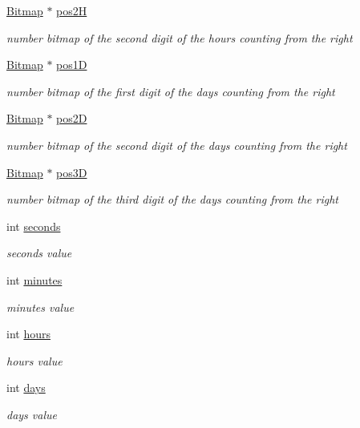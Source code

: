 \begin{DoxyCompactItemize}
\hyperlink{struct_bitmap}{Bitmap} $\ast$ \hyperlink{struct_countdown_a2bd11b0753bf2e5db41448090cd63383}{pos2H}
\begin{DoxyCompactList}\small\item\em number bitmap of the second digit of the hours counting from the right \end{DoxyCompactList}\item 
\hyperlink{struct_bitmap}{Bitmap} $\ast$ \hyperlink{struct_countdown_a39589db8fec236a931a448154c7975c5}{pos1D}
\begin{DoxyCompactList}\small\item\em number bitmap of the first digit of the days counting from the right \end{DoxyCompactList}\item 
\hyperlink{struct_bitmap}{Bitmap} $\ast$ \hyperlink{struct_countdown_a3ece20d4a7a7bc9b6fa79ef0cdf378b3}{pos2D}
\begin{DoxyCompactList}\small\item\em number bitmap of the second digit of the days counting from the right \end{DoxyCompactList}\item 
\hyperlink{struct_bitmap}{Bitmap} $\ast$ \hyperlink{struct_countdown_aca363fff11b394450053a007b084e551}{pos3D}
\begin{DoxyCompactList}\small\item\em number bitmap of the third digit of the days counting from the right \end{DoxyCompactList}\item 
int \hyperlink{struct_countdown_a77bd4f876bdc3afed5acdd936f775d34}{seconds}
\begin{DoxyCompactList}\small\item\em seconds value \end{DoxyCompactList}\item 
int \hyperlink{struct_countdown_ab693b677bdc9ded12b06daf49778101c}{minutes}
\begin{DoxyCompactList}\small\item\em minutes value \end{DoxyCompactList}\item 
int \hyperlink{struct_countdown_af23005df06fc3cd4264e5eee2dfa2f8c}{hours}
\begin{DoxyCompactList}\small\item\em hours value \end{DoxyCompactList}\item 
int \hyperlink{struct_countdown_a587b80cf207596af93422f0932dd001e}{days}
\begin{DoxyCompactList}\small\item\em days value \end{DoxyCompactList}\end{DoxyCompactItemize}


